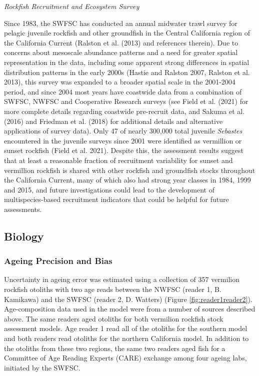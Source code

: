 \documentclass[
  english,
  a4paper,
]{article}
\begin{document}
\emph{Rockfish Recruitment and Ecosystem Survey}

Since 1983, the SWFSC has conducted an annual midwater trawl survey for pelagic
juvenile rockfish and other groundfish in the Central California region of the
California Current (Ralston et al. (2013) and references therein). Due to concerns
about mesoscale abundance patterns and a need for greater spatial representation
in the data, including some apparent strong differences in spatial distribution
patterns in the early 2000s (Hastie and Ralston 2007, Ralston et al. 2013), this survey was expanded
to a broader spatial scale in the 2001-2004 period, and since 2004 most years have
coastwide data from a combination of SWFSC, NWFSC and Cooperative Research surveys
(see Field et al. (2021) for more complete details regarding coastwide
pre-recruit data, and Sakuma et al. (2016) and Friedman et al. (2018)
for additional details and alternative applications of survey data). Only 47 of nearly 300,000 total juvenile \emph{Sebastes} encountered in the juvenile surveys since 2001 were identified as vermillion or sunset rockfish (Field et al. 2021). Despite this, the assessment results suggest that at least a reasonable fraction of recruitment variability for sunset and vermillion rockfish is shared with other rockfish and groundfish stocks throughout the California Current, many of which also had strong year classes in 1984, 1999 and 2015, and future investigations could lead to the development of multispecies-based recruitment indicators that could be helpful for future assessments.

\hypertarget{biology}{%
\subsection{Biology}\label{biology}}

\hypertarget{ageing-precision-and-bias}{%
\subsubsection{Ageing Precision and Bias}\label{ageing-precision-and-bias}}

Uncertainty in ageing error was estimated using a collection of 357 vermilion rockfish
otoliths with two age reads between the NWFSC (reader 1, B. Kamikawa) and the
SWFSC (reader 2, D. Watters) (Figure \ref{fig:reader1reader2}).
Age-composition data used in the model were from a number of sources described
above. The same readers aged otoliths for both vermilion rockfish stock assessment models.
Age reader 1 read all of the otoliths for the southern model and both readers read
otoliths for the northern California model. In addition to the otoliths from these
two regions, the same two readers aged fish for a Committee of Age Reading Experts
(CARE) exchange among four ageing labs, initiated by the SWFSC.
\end{document}
